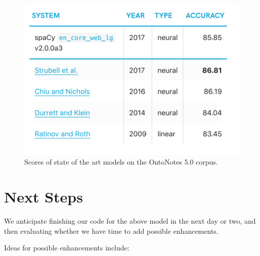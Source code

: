 \documentclass[11pt,a4paper]{article}
\begin{document}
\begin{figure}[h]
  \includegraphics[width=\linewidth]{figures/state_of_art_spaCy.png}
  \caption{Scores of state of the art models on the OntoNotes 5.0 corpus.}
  \label{fig:state_of_art}
\end{figure}

\section{Next Steps}

We anticipate finishing our code for the above model in the next day or two, and then evaluating whether we have time to add possible enhancements.

Ideas for possible enhancements include:
\end{document}
